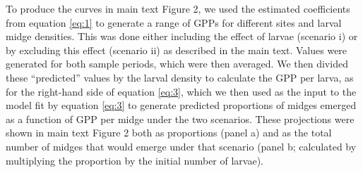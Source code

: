 \documentclass[12pt]{article}
\begin{document}
To produce the curves in main text Figure 2,
we used the estimated coefficients from equation \ref{eq:1} to generate a range of GPPs for different 
sites and larval midge densities.
This was done either including the effect of larvae (scenario i) 
or by excluding this effect (scenario ii) as described in the main text.
Values were generated for both sample periods, which were then averaged.
We then divided these ``predicted'' values by the larval density to calculate 
the GPP per larva, as for the right-hand side of equation \ref{eq:3},
which we then used as the input to the model fit by equation \ref{eq:3} to generate
predicted proportions of midges emerged as a function of GPP per midge
under the two scenarios.
These projections were shown in main text Figure 2 both as proportions (panel a)
and as the total number of midges that would emerge under that scenario 
(panel b; calculated by multiplying the proportion by the initial number of larvae).







\clearpage
\end{document}
